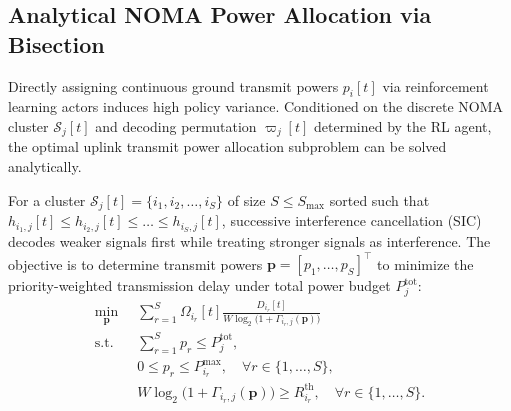 \documentclass[journal]{IEEEtran}
\begin{document}
\subsection{Analytical NOMA Power Allocation via Bisection}
\label{sec:noma_power}

Directly assigning continuous ground transmit powers $p_i[t]$ via reinforcement learning actors induces high policy variance. Conditioned on the discrete NOMA cluster $\mathcal{S}_j[t]$ and decoding permutation $\varpi_j[t]$ determined by the RL agent, the optimal uplink transmit power allocation subproblem can be solved analytically.

For a cluster $\mathcal{S}_j[t] = \{i_1, i_2, \dots, i_S\}$ of size $S \le S_{\max}$ sorted such that $h_{i_1, j}[t] \le h_{i_2, j}[t] \le \dots \le h_{i_S, j}[t]$, successive interference cancellation (SIC) decodes weaker signals first while treating stronger signals as interference. The objective is to determine transmit powers $\mathbf{p} = [p_1, \dots, p_S]^\top$ to minimize the priority-weighted transmission delay under total power budget $P_j^{\mathrm{tot}}$:
\begin{equation}
\begin{aligned}
    \min_{\mathbf{p}} \;\; & \sum_{r=1}^S \Omega_{i_r}[t] \frac{D_{i_r}[t]}{W \log_2\bigl(1 + \Gamma_{i_r, j}(\mathbf{p})\bigr)} \\
    \text{s.t.} \;\; & \sum_{r=1}^S p_r \le P_j^{\mathrm{tot}}, \\
    & 0 \le p_r \le P_{i_r}^{\max}, \quad \forall r \in \{1, \dots, S\}, \\
    & W \log_2\bigl(1 + \Gamma_{i_r, j}(\mathbf{p})\bigr) \ge R_{i_r}^{\mathrm{th}}, \quad \forall r \in \{1, \dots, S\}.
\end{aligned}
\label{eq:noma_subproblem}
\end{equation}
\end{document}
